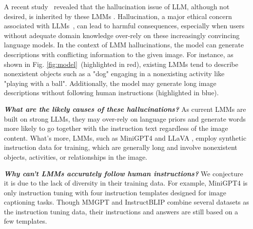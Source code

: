 A recent study~\citep{li2023otter}   revealed that the hallucination issue of LLM, although not desired, is inherited by these LMMs \citep{zhu2023minigpt, liu2023visual, gong2023multimodal, dai2023instructblip}. %
Hallucination, a major ethical concern associated with LLMs~\citep{bang2023multitask}, can lead to harmful consequences,
especially when users without adequate domain knowledge over-rely on these increasingly convincing language models.
In the context of LMM hallucinations, the model can generate descriptions with conflicting information to the given image. For instance, as shown in Fig. \ref{fig:model}~(highlighted in red), existing LMMs \citep{zhu2023minigpt, liu2023visual, dai2023instructblip, gong2023multimodal} tend to describe nonexistent objects such as a "dog" engaging in a nonexisting activity like "playing with a ball".
Additionally, the model may generate long image descriptions without following human instructions (highlighted in blue). 

\textbf{\textit{What are the likely causes of these hallucinations?}} As current LMMs are built on strong LLMs, they may over-rely on language priors and generate words more likely to go together with the instruction text regardless of the image content. What's more, LMMs, such as MiniGPT4 \citep{zhu2023minigpt} and LLaVA \citep{liu2023visual}, employ synthetic instruction data for training,  which are generally long and involve nonexistent objects, activities, or relationships in the image.

\textbf{\textit{Why can't LMMs accurately follow human instructions?}} We conjecture it is due to the lack of diversity in their training data. For example, MiniGPT4 \citep{zhu2023minigpt} is only instruction tuning with four instruction templates designed for image captioning tasks. Though MMGPT \citep{gong2023multimodal} and InstructBLIP \citep{dai2023instructblip} combine several datasets as the instruction tuning data, their instructions and answers are still based on a few templates.

